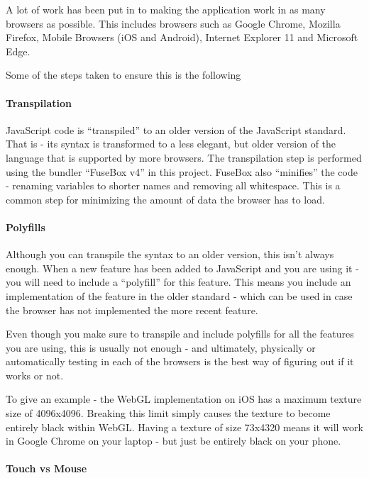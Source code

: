 A lot of work has been put in to making the application work in as many
browsers as possible. This includes browsers such as Google Chrome,
Mozilla Firefox, Mobile Browsers (iOS and Android), Internet Explorer 11
and Microsoft Edge.

Some of the steps taken to ensure this is the following

\hypertarget{transpilation}{%
\paragraph{Transpilation}\label{transpilation}}

JavaScript code is ``transpiled'' to an older version of the JavaScript
standard. That is - its syntax is transformed to a less elegant, but
older version of the language that is supported by more browsers. The
transpilation step is performed using the bundler ``FuseBox v4'' in this
project. FuseBox also ``minifies'' the code - renaming variables to
shorter names and removing all whitespace. This is a common step for
minimizing the amount of data the browser has to load.

\hypertarget{polyfills}{%
\paragraph{Polyfills}\label{polyfills}}

Although you can transpile the syntax to an older version, this isn't
always enough. When a new feature has been added to JavaScript and you
are using it - you will need to include a ``polyfill'' for this feature.
This means you include an implementation of the feature in the older
standard - which can be used in case the browser has not implemented the
more recent feature.

Even though you make sure to transpile and include polyfills for all the
features you are using, this is usually not enough - and ultimately,
physically or automatically testing in each of the browsers is the best
way of figuring out if it works or not.

To give an example - the WebGL implementation on iOS has a maximum
texture size of 4096x4096. Breaking this limit simply causes the texture
to become entirely black within WebGL. Having a texture of size 73x4320
means it will work in Google Chrome on your laptop - but just be
entirely black on your phone.

\hypertarget{touch-vs-mouse}{%
\paragraph{Touch vs Mouse}\label{touch-vs-mouse}}

